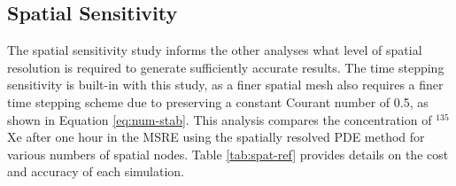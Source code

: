 \documentclass{style/nseJournal}
\begin{document}


\subsection{Spatial Sensitivity}
\label{sec:spatsens}

The spatial sensitivity study informs the other analyses what level of spatial resolution is required to generate sufficiently accurate results.
The time stepping sensitivity is built-in with this study, as a finer spatial mesh also requires a finer time stepping scheme due to preserving a constant Courant number of 0.5, as shown in Equation \eqref{eq:num-stab}.
This analysis compares the concentration of $^{135}$Xe after one hour in the MSRE using the spatially resolved PDE method for various numbers of spatial nodes.
Table \ref{tab:spat-ref} provides details on the cost and accuracy of each simulation. 


\end{document}
